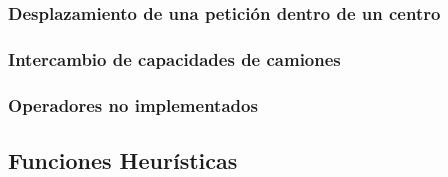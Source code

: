 \documentclass{article}
\begin{document}
\subsubsection{Desplazamiento de una petición dentro de un centro}
\subsubsection{Intercambio de capacidades de camiones}
\subsubsection{Operadores no implementados}


\subsection{Funciones Heurísticas}
\end{document}
